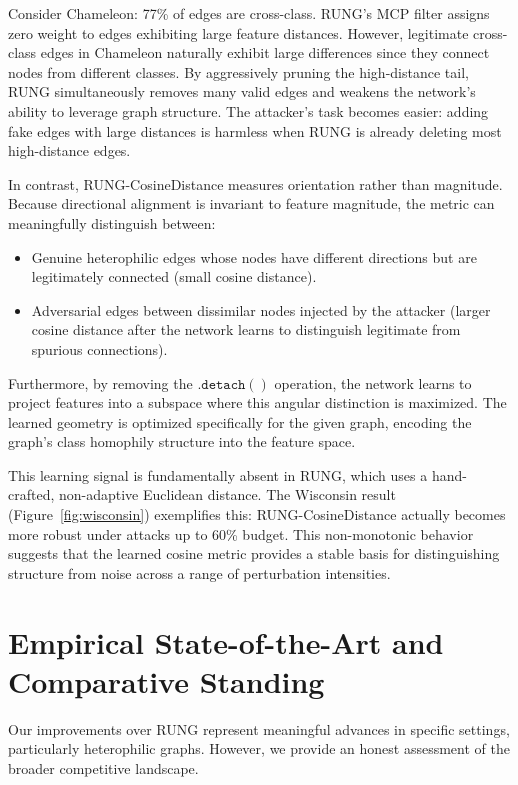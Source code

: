 \documentclass[sigconf]{acmart}
\begin{document}
Consider Chameleon: 77\% of edges are cross-class. RUNG's MCP filter assigns zero weight to edges exhibiting large feature distances. However, legitimate cross-class edges in Chameleon naturally exhibit large differences since they connect nodes from different classes. By aggressively pruning the high-distance tail, RUNG simultaneously removes many valid edges and weakens the network's ability to leverage graph structure. The attacker's task becomes easier: adding fake edges with large distances is harmless when RUNG is already deleting most high-distance edges.

In contrast, RUNG-CosineDistance measures orientation rather than magnitude. Because directional alignment is invariant to feature magnitude, the metric can meaningfully distinguish between:
\begin{itemize}
\item Genuine heterophilic edges whose nodes have different directions but are legitimately connected (small cosine distance).
\item Adversarial edges between dissimilar nodes injected by the attacker (larger cosine distance after the network learns to distinguish legitimate from spurious connections).
\end{itemize}

Furthermore, by removing the $\mathtt{.detach()}$ operation, the network learns to project features into a subspace where this angular distinction is maximized. The learned geometry is optimized specifically for the given graph, encoding the graph's class homophily structure into the feature space.

This learning signal is fundamentally absent in RUNG, which uses a hand-crafted, non-adaptive Euclidean distance. The Wisconsin result (Figure~\ref{fig:wisconsin}) exemplifies this: RUNG-CosineDistance actually becomes more robust under attacks up to 60\% budget. This non-monotonic behavior suggests that the learned cosine metric provides a stable basis for distinguishing structure from noise across a range of perturbation intensities.

\section{Empirical State-of-the-Art and Comparative Standing}
Our improvements over RUNG represent meaningful advances in specific settings, particularly heterophilic graphs. However, we provide an honest assessment of the broader competitive landscape.
\end{document}
